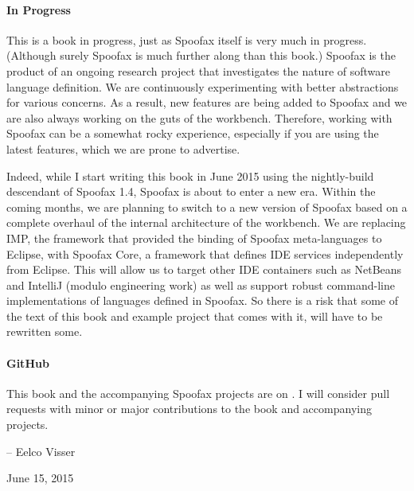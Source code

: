 \paragraph{In Progress}

This is a book in progress, just as Spoofax itself is very much in progress.
(Although surely Spoofax is much further along than this book.) Spoofax is the
product of an ongoing research project that investigates the nature of software
language definition. We are continuously experimenting with better abstractions
for various concerns.
As a result, new features are being added to Spoofax and we are also always
working on the guts of the workbench.
Therefore, working with Spoofax can be a somewhat rocky experience, especially
if you are using the latest features, which we are prone to advertise.

Indeed, while I start writing this book in June 2015 using the nightly-build
descendant of Spoofax 1.4, Spoofax is about to enter a new era.
Within the coming months, we are planning to switch to a new version of Spoofax
based on a complete overhaul of the internal architecture of the workbench.
We are replacing IMP, the framework that provided the binding of Spoofax
meta-languages to Eclipse, with Spoofax Core, a framework that defines IDE
services independently from Eclipse. This will allow us to target other IDE
containers such as NetBeans and IntelliJ (modulo engineering work) as well as
support robust command-line implementations of languages defined in Spoofax. So
there is a risk that some of the text of this book and example project that
comes with it, will have to be rewritten some.

\paragraph{GitHub}

This book and the accompanying Spoofax projects are on . 
I will consider pull requests with minor or major contributions to the book
and accompanying projects.

-- Eelco Visser

June 15, 2015


